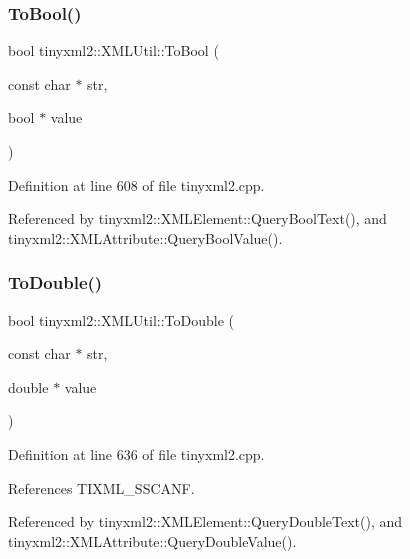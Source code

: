 \mbox{\label{classtinyxml2_1_1_x_m_l_util_ae5b03e0a1ca5d42052a7ac540f7aa12a}} 
\subsubsection{To\+Bool()}
{\footnotesize\ttfamily bool tinyxml2\+::\+X\+M\+L\+Util\+::\+To\+Bool (\begin{DoxyParamCaption}\item[{const char $\ast$}]{str,  }\item[{bool $\ast$}]{value }\end{DoxyParamCaption})\hspace{0.3cm}{\ttfamily [static]}}



Definition at line 608 of file tinyxml2.\+cpp.



Referenced by tinyxml2\+::\+X\+M\+L\+Element\+::\+Query\+Bool\+Text(), and tinyxml2\+::\+X\+M\+L\+Attribute\+::\+Query\+Bool\+Value().

\mbox{\label{classtinyxml2_1_1_x_m_l_util_ad8f75ac140fb19c1c6e164a957c4cd53}} 
\subsubsection{To\+Double()}
{\footnotesize\ttfamily bool tinyxml2\+::\+X\+M\+L\+Util\+::\+To\+Double (\begin{DoxyParamCaption}\item[{const char $\ast$}]{str,  }\item[{double $\ast$}]{value }\end{DoxyParamCaption})\hspace{0.3cm}{\ttfamily [static]}}



Definition at line 636 of file tinyxml2.\+cpp.



References T\+I\+X\+M\+L\+\_\+\+S\+S\+C\+A\+NF.



Referenced by tinyxml2\+::\+X\+M\+L\+Element\+::\+Query\+Double\+Text(), and tinyxml2\+::\+X\+M\+L\+Attribute\+::\+Query\+Double\+Value().

